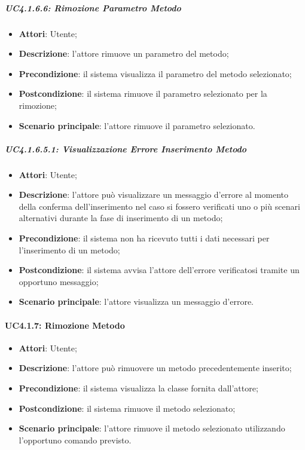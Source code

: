 \subparagraph{UC4.1.6.6: Rimozione Parametro Metodo}
\label{UC4.1.6.6}
\begin{itemize}
\item \textbf{Attori}: Utente;
\item \textbf{Descrizione}: l'attore rimuove un parametro del metodo;
\item \textbf{Precondizione}: il sistema visualizza il parametro del metodo selezionato;	
\item \textbf{Postcondizione}: il sistema rimuove il parametro selezionato per la rimozione;
\item \textbf{Scenario principale}:
l'attore rimuove il parametro selezionato.
\end{itemize}

\subparagraph{UC4.1.6.5.1: Visualizzazione Errore Inserimento Metodo}
\label{UC4.1.6.5.1}
\begin{itemize}
\item \textbf{Attori}: Utente;
\item \textbf{Descrizione}: l'attore può visualizzare un messaggio d'errore al momento della conferma dell'inserimento nel caso si fossero verificati uno o più scenari alternativi durante la fase di inserimento di un metodo;	
\item \textbf{Precondizione}: il sistema non ha ricevuto tutti i dati necessari per l'inserimento di un metodo;	
\item \textbf{Postcondizione}: il sistema avvisa l'attore dell'errore verificatosi tramite un opportuno messaggio;	
\item \textbf{Scenario principale}:
l'attore visualizza un messaggio d'errore.	
\end{itemize}

\paragraph{UC4.1.7: Rimozione Metodo}
\label{UC4.1.7}
\begin{itemize}
\item \textbf{Attori}: Utente;
\item \textbf{Descrizione}: l'attore può rimuovere un metodo precedentemente inserito;
\item \textbf{Precondizione}: il sistema visualizza la classe fornita dall'attore;
\item \textbf{Postcondizione}: il sistema rimuove il metodo selezionato;
\item \textbf{Scenario principale}:
l'attore rimuove il metodo selezionato utilizzando l'opportuno comando previsto.
\end{itemize}

